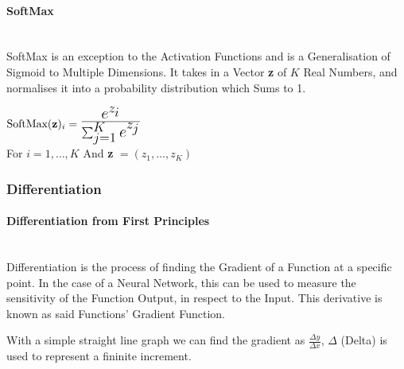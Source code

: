 \begin{flushleft}
                \paragraph{SoftMax} \mbox{} \\
                    SoftMax is an exception to the Activation Functions and is a Generalisation of Sigmoid to Multiple Dimensions. It
                    takes in a Vector \textbf{z} of $K$ Real Numbers, and normalises it into a probability distribution which Sums to 1. \\ 

                    \begin{center}
                        \begin{math}
                            \text{SoftMax}(\textbf{z})_{i} = \mathLarge{\frac{e^{z_{i}}}{\sum_{j=1}^{K} e^{z_{j}}}}
                        \end{math} \\
                        \vspace{0.2cm}
                        For $i = 1, \hdots,K$ And \textbf{z} $ = (z_{1},\hdots,z_{K})$ \\
                    \end{center}           
            \subsubsection{Differentiation}
                \paragraph{Differentiation from First Principles}  \mbox{} \\
                    \vspace{0.2cm}
                    Differentiation is the process of finding the Gradient of a Function at a specific point. In the case of a Neural Network,
                    this can be used to measure the sensitivity of the Function Output, in respect to the Input. This derivative is known as said 
                    Functions' Gradient Function. \\
                    \vspace{0.2cm}
                    
                    With a simple straight line graph we can find the gradient as {\Large$\frac{\Delta y}{\Delta x}$, $\Delta$} (Delta) is used to 
                    represent a fininite increment. \\
                    \vspace{0.2cm}


\end{flushleft}
